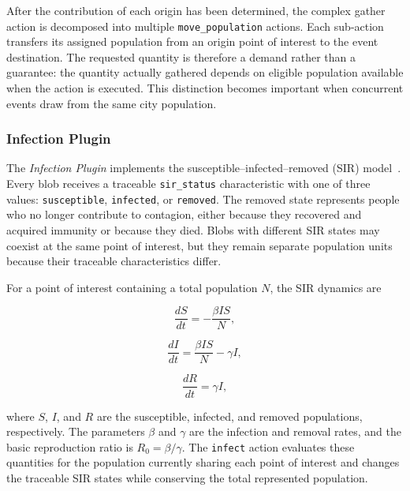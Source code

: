 After the contribution of each origin has been determined, the complex gather action is decomposed into multiple \texttt{move\_population} actions. Each sub-action transfers its assigned population from an origin point of interest to the event destination. The requested quantity is therefore a demand rather than a guarantee: the quantity actually gathered depends on eligible population available when the action is executed. This distinction becomes important when concurrent events draw from the same city population.

\subsubsection{Infection Plugin}

The \textit{Infection Plugin} implements the susceptible--infected--removed (SIR) model~\citep{kermack1927contribution}. Every blob receives a traceable \texttt{sir\_status} characteristic with one of three values: \texttt{susceptible}, \texttt{infected}, or \texttt{removed}. The removed state represents people who no longer contribute to contagion, either because they recovered and acquired immunity or because they died. Blobs with different SIR states may coexist at the same point of interest, but they remain separate population units because their traceable characteristics differ.

For a point of interest containing a total population $N$, the SIR dynamics are

\begin{equation}
\label{eq:large_scale_epidemic_delta_s}
   \frac{dS}{dt}=-\frac{\beta I S}{N},
\end{equation}

\begin{equation}
\label{eq:large_scale_epidemic_delta_i}
   \frac{dI}{dt}=\frac{\beta I S}{N}-\gamma I,
\end{equation}

\begin{equation}
\label{eq:large_scale_epidemic_delta_r}
   \frac{dR}{dt}=\gamma I,
\end{equation}

where $S$, $I$, and $R$ are the susceptible, infected, and removed populations, respectively. The parameters $\beta$ and $\gamma$ are the infection and removal rates, and the basic reproduction ratio is $R_0=\beta/\gamma$. The \texttt{infect} action evaluates these quantities for the population currently sharing each point of interest and changes the traceable SIR states while conserving the total represented population.

